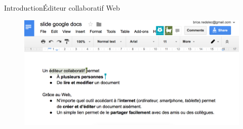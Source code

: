 \begin{frame}{Introduction}{Éditeur collaboratif Web}
    

  \begin{figure}
    \begin{center}
      \includegraphics[width=\textwidth]{img/googledocs3.png}
    \end{center}
  \end{figure}
\end{frame}



